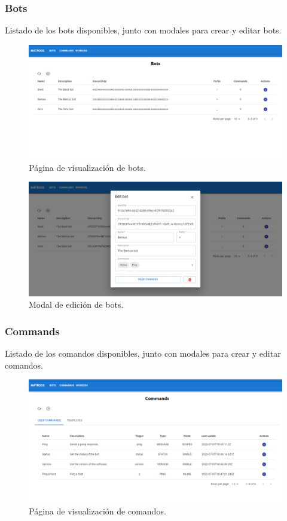 \subsubsection{Bots}

Listado de los bots disponibles, junto con modales para crear y editar bots.

\begin{figure}[H]
	\centering
	\includegraphics[width=1\textwidth]{img/front/page-bots.png}
	\caption{Página de visualización de bots.}
\end{figure}

\begin{figure}[H]
	\centering
	\includegraphics[width=1\textwidth]{img/front/page-bots-edit.png}
	\caption{Modal de edición de bots.}
\end{figure}

\subsubsection{Commands}

Listado de los comandos disponibles, junto con modales para crear y editar comandos.

\begin{figure}[H]
	\centering
	\includegraphics[width=1\textwidth]{img/front/page-commands.png}
	\caption{Página de visualización de comandos.}
\end{figure}

